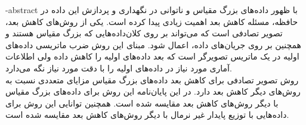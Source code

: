 
\fa-abstract{
با ظهور داده‌های بزرگ مقیاس و ناتوانی در نگهداری و پردازش این داده در حافظه، مسئله کاهش بعد اهمیت زیادی پیدا کرده است. یکی از روش‌های کاهش بعد، تصویر تصادفی است که می‌تواند بر روی کلان‌داده‌هایی که بزرگ مقیاس هستند و همچنین بر روی جریان‌های داده، اعمال شود. مبنای این روش ضرب ماتریسی داده‌های اولیه در یک ماتریس تصویرگر است که بعد داده‌های اولیه را کاهش داده ولی اطلاعات آماری مورد نیاز در داده‌های اولیه را با دقت مورد نیاز نگه می‌دارد. \\
روش تصویر تصادفی برای کاهش بعد داده‌های بزرگ مقیاس مزایای متعددی نسبت به روش‌های دیگر کاهش بعد دارد. در این پایان‌نامه این روش برای داده‌های بزرگ مقیاس با دیگر روش‌های کاهش بعد مقایسه شده است. همچنین توانایی این روش برای داده‌هایی با توزیع پایدار غیر نرمال با دیگر روش‌های کاهش بعد مقایسه شده است.
}





\AUTtitle
